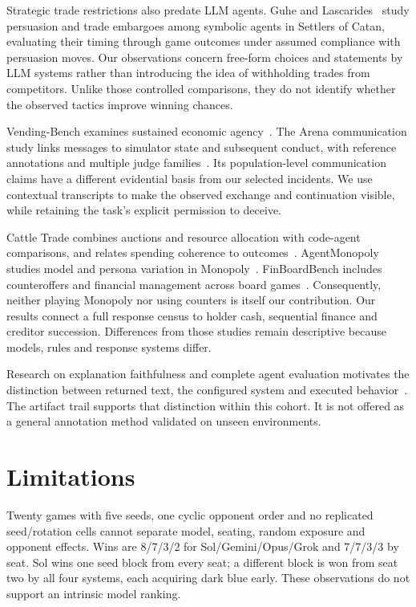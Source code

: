 Strategic trade restrictions also predate LLM agents. Guhe and Lascarides~\cite{guhe2014persuasion} study persuasion and trade embargoes among symbolic agents in Settlers of Catan, evaluating their timing through game outcomes under assumed compliance with persuasion moves. Our observations concern free-form choices and statements by LLM systems rather than introducing the idea of withholding trades from competitors. Unlike those controlled comparisons, they do not identify whether the observed tactics improve winning chances.

Vending-Bench examines sustained economic agency~\cite{backlund2025vendingbench}. The Arena communication study links messages to simulator state and subsequent conduct, with reference annotations and multiple judge families~\cite{li2026arena}. Its population-level communication claims have a different evidential basis from our selected incidents. We use contextual transcripts to make the observed exchange and continuation visible, while retaining the task's explicit permission to deceive.

Cattle Trade combines auctions and resource allocation with code-agent comparisons, and relates spending coherence to outcomes~\cite{muller2026cattletrade}. AgentMonopoly studies model and persona variation in Monopoly~\cite{wu2026agentmonopoly}. FinBoardBench includes counteroffers and financial management across board games~\cite{hu2026finboardbench}. Consequently, neither playing Monopoly nor using counters is itself our contribution. Our results connect a full response census to holder cash, sequential finance and creditor succession. Differences from those studies remain descriptive because models, rules and response systems differ.

Research on explanation faithfulness and complete agent evaluation motivates the distinction between returned text, the configured system and executed behavior~\cite{turpin2023unfaithful,lanham2023faithfulness,kapoor2026hal,zhang2026dece}. The artifact trail supports that distinction within this cohort. It is not offered as a general annotation method validated on unseen environments.

\section{Limitations}
Twenty games with five seeds, one cyclic opponent order and no replicated seed/rotation cells cannot separate model, seating, random exposure and opponent effects. Wins are 8/7/3/2 for Sol/Gemini/Opus/Grok and 7/7/3/3 by seat. Sol wins one seed block from every seat; a different block is won from seat two by all four systems, each acquiring dark blue early. These observations do not support an intrinsic model ranking.

